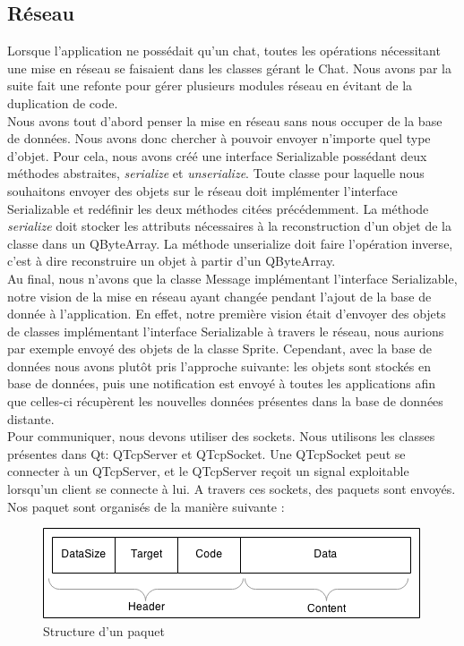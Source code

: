 \subsection{Réseau}


Lorsque l'application ne possédait qu'un chat, toutes les opérations nécessitant une mise en réseau se faisaient dans les classes gérant le Chat. Nous avons par la suite fait une refonte pour gérer plusieurs modules réseau en évitant de la duplication de code.\\

Nous avons tout d'abord penser la mise en réseau sans nous occuper de la base de données. Nous avons donc chercher à pouvoir envoyer n'importe quel type d'objet. Pour cela, nous avons créé une interface Serializable possédant deux méthodes abstraites, \emph{serialize} et \emph{unserialize}. Toute classe pour laquelle nous souhaitons envoyer des objets sur le réseau doit implémenter l'interface Serializable et redéfinir les deux méthodes citées précédemment. La méthode \emph{serialize} doit stocker les attributs nécessaires à la reconstruction d'un objet de la classe dans un QByteArray. La méthode unserialize doit faire l'opération inverse, c'est à dire reconstruire un objet à partir d'un QByteArray.\\
Au final, nous n'avons que la classe Message implémentant l'interface Serializable, notre vision de la mise en réseau ayant changée pendant l'ajout de la base de donnée à l'application. En effet, notre première vision était d'envoyer des objets de classes implémentant l'interface Serializable à travers le réseau, nous aurions par exemple envoyé des objets de la classe Sprite. Cependant, avec la base de données nous avons plutôt pris l'approche suivante: les objets sont stockés en base de données, puis une notification est envoyé à toutes les applications afin que celles-ci récupèrent les nouvelles données présentes dans la base de données distante.\\

Pour communiquer, nous devons utiliser des sockets. Nous utilisons les classes présentes dans Qt: QTcpServer et QTcpSocket. Une QTcpSocket peut se connecter à un QTcpServer, et le QTcpServer reçoit un signal exploitable lorsqu'un client se connecte à lui. A travers ces sockets, des paquets sont envoyés. Nos paquet sont organisés de la manière suivante :\\

\begin{figure}[h!]
	\centering
	\includegraphics[scale=0.6]{img/network_packet.png}
	\caption{Structure d'un paquet}
\end{figure}

